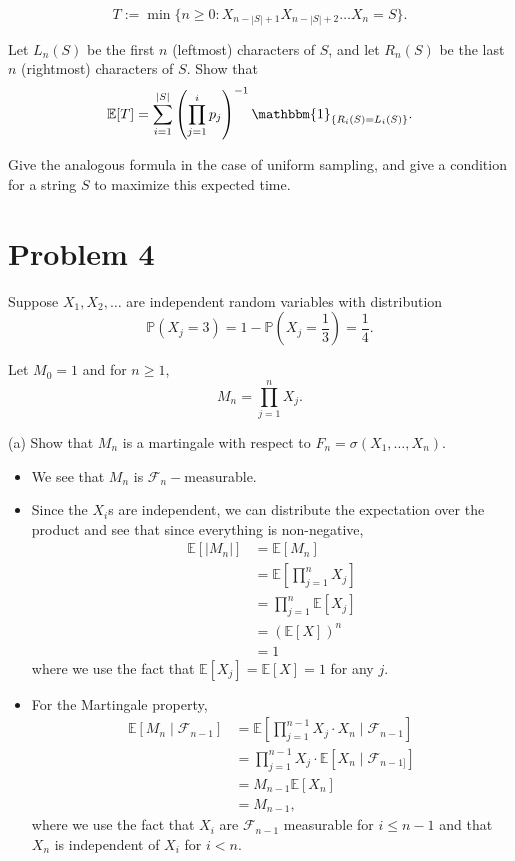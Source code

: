 \documentclass[11pt]{article}
\newcommand{\bbE}{\mathbb{E}}
\begin{document}
\[
T := \min\{n \geq 0 : X_{n-|S|+1} X_{n-|S|+2} \ldots X_n = S\}.
\]

Let \(L_n(S)\) be the first \(n\) (leftmost) characters of \(S\), and let \(R_n(S)\) be the last \(n\) (rightmost) characters of \(S\). Show that
\[
\mathbb{E}[T] = \sum_{i=1}^{|S|} \left(\prod_{j=1}^i p_j \right)^{-1} \mathbbm{1}_{\{R_i(S) = L_i(S)\}}.
\]

Give the analogous formula in the case of uniform sampling, and give a condition for a string \(S\) to maximize this expected time.

\newpage

\section*{Problem 4}
Suppose \(X_1, X_2, \ldots\) are independent random variables with distribution
\[
\mathbb{P}(X_j = 3) = 1 - \mathbb{P}\left(X_j = \frac{1}{3}\right) = \frac{1}{4}.
\]

Let \(M_0 = 1\) and for \(n \geq 1\),
\[
M_n = \prod_{j=1}^n X_j.
\]

(a) Show that \(M_n\) is a martingale with respect to \(F_n = \sigma(X_1, \ldots, X_n)\).
\begin{solution}
\begin{itemize}
    \item We see that $M_n$ is $\mathcal{F}_n-$measurable.
    \item Since the $X_i$s are independent, we can distribute the expectation over the product and see that  since everything is non-negative,
    \begin{align*}
        \bbE[|M_n|] &= \bbE[M_n]\\
        &= \bbE\left[\prod_{j=1}^n X_j\right]\\
        &= \prod_{j=1}^n\bbE[X_j]\\
        &= (\bbE[X])^n\\
        &= 1
    \end{align*} where we use the fact that $\bbE[X_j] = \bbE[X] = 1$ for any $j.$ 
    \item For the Martingale property, 
    \begin{align*}
        \bbE[M_n \mid \mathcal{F}_{n-1}]
        &= \bbE\left[\prod_{j=1}^{n-1}X_{j}\cdot  X_n\mid \mathcal{F}_{n-1}\right]\\
        &= \prod_{j=1}^{n-1}X_j \cdot \bbE[X_n \mid \mathcal{F}_{n-1]}]\\
        &= M_{n-1}\bbE[X_n]\\
        &= M_{n-1},
    \end{align*}
    where we use the fact that $X_i$ are $\mathcal{F}_{n-1}$ measurable for $i\leq n-1$ and that $X_n$ is independent of $X_i$ for $i< n.$
\end{itemize}



\end{solution}
\end{document}
